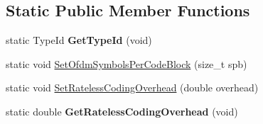 \subsection*{\-Static \-Public \-Member \-Functions}
\begin{DoxyCompactItemize}
\item 
\hypertarget{classns3_1_1PLC__InformationRatePhy_aa27e24ab2e80873e068ec07fe79ae046}{static \-Type\-Id {\bfseries \-Get\-Type\-Id} (void)}\label{classns3_1_1PLC__InformationRatePhy_aa27e24ab2e80873e068ec07fe79ae046}

\item 
static void \hyperlink{classns3_1_1PLC__InformationRatePhy_a7086fc3196e45abe16d1128bb6ec1453}{\-Set\-Ofdm\-Symbols\-Per\-Code\-Block} (size\-\_\-t spb)
\item 
static void \hyperlink{classns3_1_1PLC__InformationRatePhy_a10a515ea96d92613a7011122cb2f5ea3}{\-Set\-Rateless\-Coding\-Overhead} (double overhead)
\item 
\hypertarget{classns3_1_1PLC__InformationRatePhy_a549d06665933be742b8c614d930659ae}{static double {\bfseries \-Get\-Rateless\-Coding\-Overhead} (void)}\label{classns3_1_1PLC__InformationRatePhy_a549d06665933be742b8c614d930659ae}

\end{DoxyCompactItemize}
